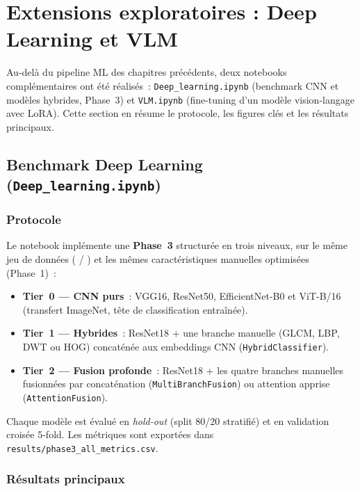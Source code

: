 \chapter{Extensions exploratoires : Deep Learning et VLM}

Au-delà du pipeline ML des chapitres précédents, deux notebooks complémentaires ont été
réalisés~: \texttt{Deep\_learning.ipynb} (benchmark CNN et modèles hybrides, Phase~3) et
\texttt{VLM.ipynb} (fine-tuning d'un modèle vision-langage avec LoRA). Cette section en
résume le protocole, les figures clés et les résultats principaux.

\section{Benchmark Deep Learning (\texttt{Deep\_learning.ipynb})}

\subsection{Protocole}

Le notebook implémente une \textbf{Phase~3} structurée en trois niveaux, sur le même jeu de
données (\NTrain{} / \NTest{}) et les mêmes caractéristiques manuelles optimisées (Phase~1)~:

\begin{itemize}[leftmargin=1.4em,itemsep=2pt]
  \item \textbf{Tier~0 --- CNN purs}~: VGG16, ResNet50, EfficientNet-B0 et ViT-B/16
        (transfert ImageNet, tête de classification entraînée).
  \item \textbf{Tier~1 --- Hybrides}~: ResNet18 + une branche manuelle (GLCM, LBP, DWT ou HOG)
        concaténée aux embeddings CNN (\texttt{HybridClassifier}).
  \item \textbf{Tier~2 --- Fusion profonde}~: ResNet18 + les quatre branches manuelles fusionnées
        par concaténation (\texttt{MultiBranchFusion}) ou attention apprise
        (\texttt{AttentionFusion}).
\end{itemize}

Chaque modèle est évalué en \emph{hold-out} (split 80/20 stratifié) et en validation croisée
5-fold. Les métriques sont exportées dans \texttt{results/phase3\_all\_metrics.csv}.

\subsection{Résultats principaux}


